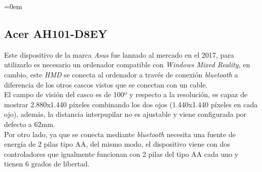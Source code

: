 \parindent=0em
\subsection{Acer AH101-D8EY}
\noindent

Este dispositivo de la marca \textit{Asus} fue lanzado al mercado en el 2017, para utilizarlo es necesario un ordenador compatible con \textit{Windows Mixed Reality}, en cambio, este \textit{HMD} se conecta al ordenador a través de conexión \textit{bluetooth} a diferencia de los otros cascos vistos que se conectan con un cable.\\

El campo de visión del casco es de 100º y respecto a la resolución, es capaz de mostrar 2.880x1.440 píxeles combinando los dos ojos (1.440x1.440 píxeles en cada ojo), además, la distancia interpupilar no es ajustable y viene configurada por defecto a 62mm.\\

Por otro lado, ya que se conecta mediante \textit{bluetooth} necesita una fuente de energía de 2 pilas tipo AA, del mismo modo, el dispositivo viene con dos controladores que igualmente funcionan con 2 pilas del tipo AA cada uno y tienen 6 grados de libertad. 